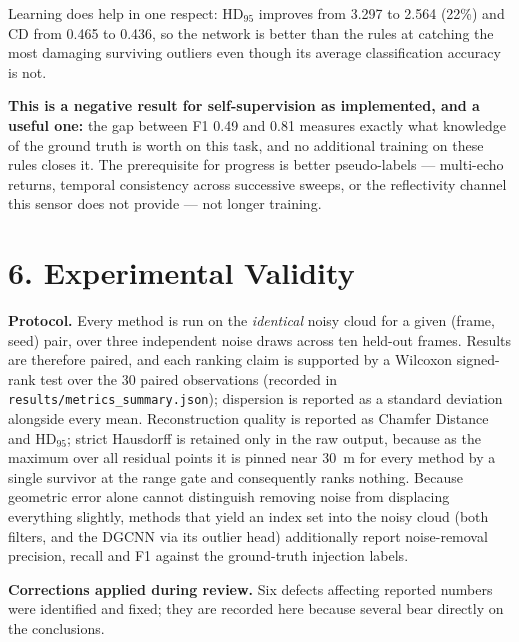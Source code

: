 \documentclass[12pt,a4paper]{article}
\begin{document}
Learning does help in one respect: HD$_{95}$ improves from 3.297 to 2.564
(22\%) and CD from 0.465 to 0.436, so the network is better than the rules
at catching the most damaging surviving outliers even though its average
classification accuracy is not.

\textbf{This is a negative result for self-supervision as implemented, and a
useful one:} the gap between F1 0.49 and 0.81 measures exactly what
knowledge of the ground truth is worth on this task, and no additional
training on these rules closes it. The prerequisite for progress is better
pseudo-labels --- multi-echo returns, temporal consistency across successive
sweeps, or the reflectivity channel this sensor does not provide --- not
longer training.

\section*{6. Experimental Validity}

\textbf{Protocol.} Every method is run on the \emph{identical} noisy cloud
for a given (frame, seed) pair, over three independent noise draws across
ten held-out frames. Results are therefore paired, and each ranking claim
is supported by a Wilcoxon signed-rank test over the 30 paired observations
(recorded in \texttt{results/metrics\_summary.json}); dispersion is reported
as a standard deviation alongside every mean. Reconstruction quality is
reported as Chamfer Distance and HD$_{95}$; strict Hausdorff is retained
only in the raw output, because as the maximum over all residual points it
is pinned near 30~m for every method by a single survivor at the range gate
and consequently ranks nothing. Because geometric error alone cannot
distinguish removing noise from displacing everything slightly, methods
that yield an index set into the noisy cloud (both filters, and the DGCNN
via its outlier head) additionally report noise-removal precision, recall
and F1 against the ground-truth injection labels.

\textbf{Corrections applied during review.} Six defects affecting reported
numbers were identified and fixed; they are recorded here because several
bear directly on the conclusions.
\end{document}
